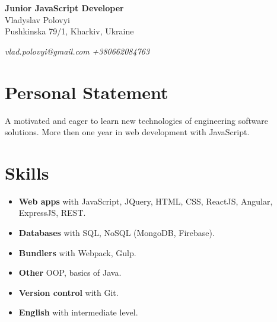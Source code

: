 \documentclass[a4paper]{article}
\begin{document}
	\begin{center}
		{\huge\bfseries Junior JavaScript Developer} \\[1em]
		{\Large Vladyslav Polovyi} \\[1em]
		\faMapMarker \quad Pushkinska 79/1, Kharkiv, Ukraine
	\end{center}
	\vspace{1em}
	\textit{\faPaperPlane \quad vlad.polovyi@gmail.com} \hspace*{\fill} \textit{\faPhone \quad +380662084763} 

	\section*{Personal Statement}
	A motivated and eager to learn new technologies of engineering software solutions. More then one year in web development with JavaScript.

	\section*{Skills}
	\begin{multicols}{2}
	\begin{itemize}
		\item \textbf{Web apps} with JavaScript, JQuery, HTML, CSS, ReactJS, Angular, ExpressJS, REST.
		\item \textbf{Databases} with SQL, NoSQL (MongoDB, Firebase).
		\item \textbf{Bundlers} with Webpack, Gulp.
		\item \textbf{Other} OOP, basics of Java.
		\item \textbf{Version control} with Git.
		\item \textbf{English} with intermediate level.
	\end{itemize}
	\end{multicols}
	
\end{document}
